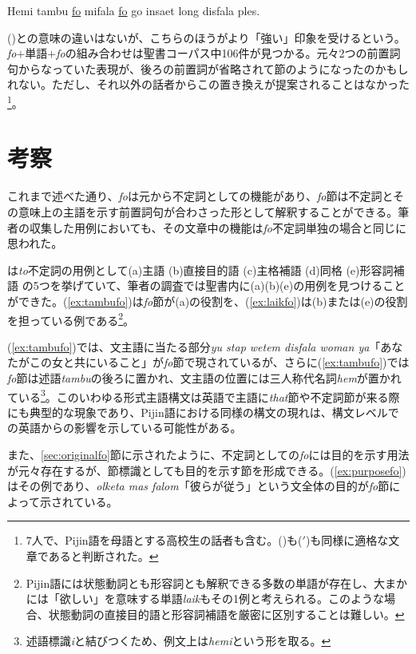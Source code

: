 \begin{exe}
 Hemi tambu \underline{fo} mifala \underline{fo} go insaet long disfala ples.
\end{exe}

()との意味の違いはないが、こちらのほうがより「強い」印象を受けるという。\textit{fo}$+$単語$+$\textit{fo}の組み合わせは聖書コーパス中106件が見つかる。元々2つの前置詞句からなっていた表現が、後ろの前置詞が省略されて節のようになったのかもしれない。ただし、それ以外の話者からこの置き換えが提案されることはなかった\footnote{7人で、Pijin語を母語とする高校生の話者も含む。()も($'$)も同様に適格な文章であると判断された。}。
\section{考察}
これまで述べた通り、\textit{fo}は元から不定詞としての機能があり、\textit{fo}節は不定詞とその意味上の主語を示す前置詞句が合わさった形として解釈することができる。筆者の収集した用例においても、その文章中の機能は\textit{fo}不定詞単独の場合と同じに思われた。

\cite{english}は\textit{to}不定詞の用例として(a)主語 (b)直接目的語 (c)主格補語 (d)同格 (e)形容詞補語 の5つを挙げていて、筆者の調査では聖書内に(a)(b)(e)の用例を見つけることができた。(\ref{ex:tambufo})は\textit{fo}節が(a)の役割を、(\ref{ex:laikfo})は(b)または(e)の役割を担っている例である\footnote{Pijin語には状態動詞とも形容詞とも解釈できる多数の単語が存在し\cite[xvi]{dictionary}、大まかには「欲しい」を意味する単語\textit{laik}もその1例と考えられる。このような場合、状態動詞の直接目的語と形容詞補語を厳密に区別することは難しい。
}。

(\ref{ex:tambufo})では、文主語に当たる部分\textit{yu stap wetem disfala woman ya}「あなたがこの女と共にいること」が\textit{fo}節で現されているが、さらに(\ref{ex:tambufo})では\textit{fo}節は述語\textit{tambu}の後ろに置かれ、文主語の位置には三人称代名詞\textit{hem}が置かれている\footnote{述語標識\textit{i}と結びつくため、例文上は\textit{hemi}という形を取る。}。このいわゆる形式主語構文は英語で主語に\textit{that}節や不定詞節が来る際にも典型的な現象であり\citep[1049, 1391--1392]{english}、Pijin語における同様の構文の現れは、構文レベルでの英語からの影響を示している可能性がある。

また、\ref{sec:originalfo}節に示されたように、不定詞としての\textit{fo}には目的を示す用法が元々存在するが、節標識としても目的を示す節を形成できる。(\ref{ex:purposefo})はその例であり、\textit{olketa mas falom}「彼らが従う」という文全体の目的が\textit{fo}節によって示されている。
